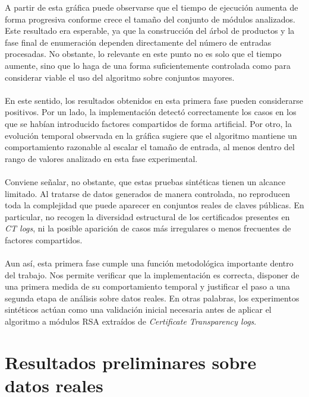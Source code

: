 A partir de esta gráfica puede observarse que el tiempo de ejecución aumenta de forma progresiva conforme crece el tamaño del conjunto de módulos analizados. Este resultado era esperable, ya que la construcción del árbol de productos y la fase final de enumeración dependen directamente del número de entradas procesadas. No obstante, lo relevante en este punto no es solo que el tiempo aumente, sino que lo haga de una forma suficientemente controlada como para considerar viable el uso del algoritmo sobre conjuntos mayores.
\\
\\
En este sentido, los resultados obtenidos en esta primera fase pueden considerarse positivos. Por un lado, la implementación detectó correctamente los casos en los que se habían introducido factores compartidos de forma artificial. Por otro, la evolución temporal observada en la gráfica sugiere que el algoritmo mantiene un comportamiento razonable al escalar el tamaño de entrada, al menos dentro del rango de valores analizado en esta fase experimental.
\\
\\
Conviene señalar, no obstante, que estas pruebas sintéticas tienen un alcance limitado. Al tratarse de datos generados de manera controlada, no reproducen toda la complejidad que puede aparecer en conjuntos reales de claves públicas. En particular, no recogen la diversidad estructural de los certificados presentes en \textit{CT logs}, ni la posible aparición de casos más irregulares o menos frecuentes de factores compartidos.
\\
\\
Aun así, esta primera fase cumple una función metodológica importante dentro del trabajo. Nos permite verificar que la implementación es correcta, disponer de una primera medida de su comportamiento temporal y justificar el paso a una segunda etapa de análisis sobre datos reales. En otras palabras, los experimentos sintéticos actúan como una validación inicial necesaria antes de aplicar el algoritmo a módulos RSA extraídos de \textit{Certificate Transparency logs}.

\section{Resultados preliminares sobre datos reales}

